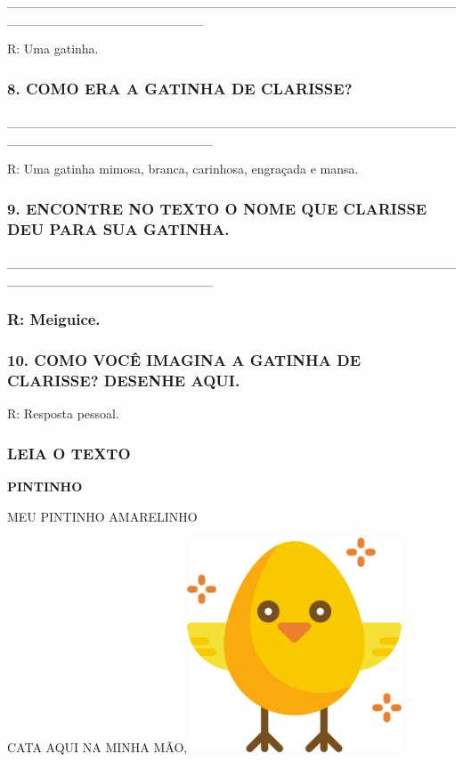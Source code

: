\_\_\_\_\_\_\_\_\_\_\_\_\_\_\_\_\_\_\_\_\_\_\_\_\_\_\_\_\_\_\_\_\_\_\_\_\_\_\_\_\_\_\_\_\_\_\_\_\_\_\_\_\_\_\_\_\_\_\_\_\_\_\_\_\_\_\_\_\_

R: Uma gatinha.

\subsubsection{8. COMO ERA A GATINHA DE
CLARISSE?}\label{como-era-a-gatinha-de-clarisse}

\_\_\_\_\_\_\_\_\_\_\_\_\_\_\_\_\_\_\_\_\_\_\_\_\_\_\_\_\_\_\_\_\_\_\_\_\_\_\_\_\_\_\_\_\_\_\_\_\_\_\_\_\_\_\_\_\_\_\_\_\_\_\_\_\_\_\_\_\_\_

R: Uma gatinha mimosa, branca, carinhosa, engraçada e mansa.

\subsubsection{9. ENCONTRE NO TEXTO O NOME QUE CLARISSE DEU PARA SUA
GATINHA.}\label{encontre-no-texto-o-nome-que-clarisse-deu-para-sua-gatinha.pinte-e-depois-escreva.}

\_\_\_\_\_\_\_\_\_\_\_\_\_\_\_\_\_\_\_\_\_\_\_\_\_\_\_\_\_\_\_\_\_\_\_\_\_\_\_\_\_\_\_\_\_\_\_\_\_\_\_\_\_\_\_\_\_\_\_\_\_\_\_\_\_\_\_\_\_\_

\subsubsection{R: Meiguice.}\label{r-meiguice.}

\subsubsection{10. COMO VOCÊ IMAGINA A GATINHA DE CLARISSE?
DESENHE AQUI.}\label{como-vocuxea-imagina-que-era-a-gatinha-de-clarrise-desenhe-aqui.}

R: Resposta pessoal.

\subsubsection{LEIA O TEXTO}\label{leia-o-texto}

\textbf{PINTINHO}

MEU PINTINHO AMARELINHO

CATA AQUI NA MINHA
MÃO,\includegraphics[width=2.51042in,height=2.51042in]{media/image129.png}

